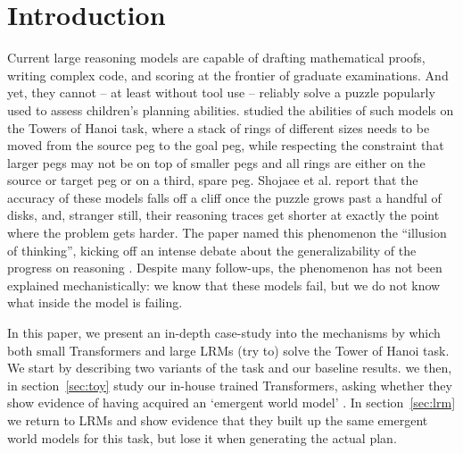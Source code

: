 \documentclass{article} %
\begin{document}
\section{Introduction}
\label{sec:introduction}

Current large reasoning models are capable of drafting mathematical
proofs, writing complex code, and scoring at the frontier of graduate
examinations. And yet, they cannot -- at least without tool use --
reliably solve a puzzle popularly used to assess children's planning
abilities. \citet{shojaee2025illusion} studied the abilities of such
models on the Towers of Hanoi task, where a stack of rings of
different sizes needs to be moved from the source peg to the goal peg,
while respecting the constraint that larger pegs may not be on top of
smaller pegs and all rings are either on the source or target peg or
on a third, spare peg. Shojaee et al. report that the accuracy of
these models falls off a cliff once the puzzle grows past a handful of
disks, and, stranger still, their reasoning traces get shorter at
exactly the point where the problem gets harder. The paper named this
phenomenon the \enquote{illusion of thinking}, kicking off an intense
debate about the generalizability of the progress on reasoning \cite{varela_rethinking_2025,meyerson_solving_2025,zhao_is_2026}. Despite many follow-ups, the phenomenon has not been explained mechanistically: we know
that these models fail, but we do not know what inside the model is
failing.

In this paper, we present an in-depth case-study into the mechanisms by which both small Transformers and large LRMs (try to) solve the Tower of Hanoi task. We start by describing two variants of the task and our baseline results. we then, in section~\ref{sec:toy} study our in-house trained Transformers, asking whether they show evidence of having acquired an `emergent world model' \citep{nanda2023emergent}. In section~\ref{sec:lrm} we return to LRMs and show evidence that they built up the same emergent world models for this task, but lose it when generating the actual plan.
\end{document}
